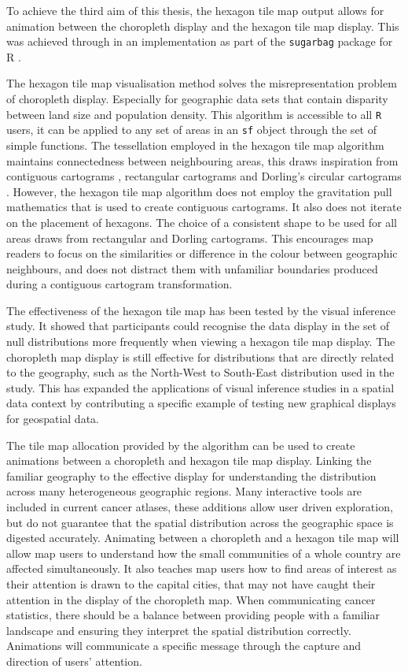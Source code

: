 \documentclass{monashthesis}
\begin{document}
To achieve the third aim of this thesis, the hexagon tile map output allows for animation between the choropleth display and the hexagon tile map display. This was achieved through in an implementation as part of the \texttt{sugarbag} \autocite{sugarbag} package for R \autocite{R}.

The hexagon tile map visualisation method solves the misrepresentation problem of choropleth display. Especially for geographic data sets that contain disparity between land size and population density. This algorithm is accessible to all \texttt{R} users, it can be applied to any set of areas in an \texttt{sf} \autocite{sf} object through the set of simple functions.
The tessellation employed in the hexagon tile map algorithm maintains connectedness between neighbouring areas, this draws inspiration from contiguous cartograms \autocite{ACA}, rectangular cartograms \autocite{RSCW} and Dorling's circular cartograms \autocite{ACTUC}. However, the hexagon tile map algorithm does not employ the gravitation pull mathematics that is used to create contiguous cartograms. It also does not iterate on the placement of hexagons. The choice of a consistent shape to be used for all areas draws from rectangular and Dorling cartograms. This encourages map readers to focus on the similarities or difference in the colour between geographic neighbours, and does not distract them with unfamiliar boundaries produced during a contiguous cartogram transformation.

The effectiveness of the hexagon tile map has been tested by the visual inference study. It showed that participants could recognise the data display in the set of null distributions more frequently when viewing a hexagon tile map display. The choropleth map display is still effective for distributions that are directly related to the geography, such as the North-West to South-East distribution used in the study. This has expanded the applications of visual inference studies in a spatial data context by contributing a specific example of testing new graphical displays for geospatial data.

The tile map allocation provided by the algorithm can be used to create animations between a choropleth and hexagon tile map display. Linking the familiar geography to the effective display for understanding the distribution across many heterogeneous geographic regions. Many interactive tools are included in current cancer atlases, these additions allow user driven exploration, but do not guarantee that the spatial distribution across the geographic space is digested accurately.
Animating between a choropleth and a hexagon tile map will allow map users to understand how the small communities of a whole country are affected simultaneously. It also teaches map users how to find areas of interest as their attention is drawn to the capital cities, that may not have caught their attention in the display of the choropleth map. When communicating cancer statistics, there should be a balance between providing people with a familiar landscape and ensuring they interpret the spatial distribution correctly. Animations will communicate a specific message through the capture and direction of users' attention.
\end{document}
